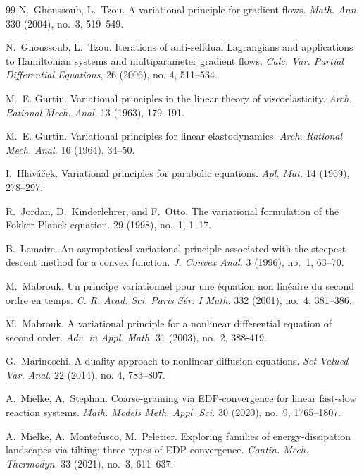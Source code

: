\documentclass[reqno]{amsart}
\begin{document}
\begin{thebibliography}{99}
{N.~Ghoussoub, L.~Tzou}. {A variational principle for gradient
  flows}. {\it Math. Ann.} 330 (2004), no.~3, 519--549.

N.~Ghoussoub, L.~Tzou. Iterations of anti-selfdual Lagrangians and
applications to Hamiltonian systems and multiparameter gradient
flows. {\it Calc. Var. Partial Differential Equations}, 26 (2006),
no. 4, 511–534.

{M.~E. Gurtin}. {Variational principles in the linear theory of
  viscoelasticity}. {\it Arch. Rational Mech. Anal.} 13 (1963), 179--191.

{M.~E. Gurtin}. {Variational
  principles for linear elastodynamics}. {\it  Arch. Rational Mech. Anal.} 16 (1964),
  34--50.

{I.~Hlav{\'a}{\v{c}}ek}. {Variational principles for parabolic
  equations}. {\it Apl. Mat.} 14 (1969), 278--297.

 R.~Jordan, D.~Kinderlehrer, and F.~Otto. \newblock The variational formulation of the Fokker-Planck equation.
    29 (1998),  no.~1,   1--17.

{B.~Lemaire}.  An asymptotical variational principle associated with
  the steepest descent method for a convex function. {\it J. Convex Anal.} 3
  (1996), no.~1, 63--70.

M.~Mabrouk. Un principe
  variationnel pour une \'equation non lin\'eaire du second ordre en
  temps. {\it C.
  R. Acad. Sci. Paris S\'er. I Math.} 332 (2001), no.~4,  381--386.

M.~Mabrouk. A variational
  principle for a nonlinear differential equation of second order. {\it Adv. in
  Appl. Math.} 31 (2003), no.~2, 388-419.

G.~Marinoschi. A duality approach to nonlinear diffusion
equations. {\it Set-Valued Var. Anal.} 22 (2014), no. 4, 783--807.

  A.~Mielke, A.~Stephan. Coarse-graining via EDP-convergence for
  linear fast-slow reaction systems. {\it Math. Models 
  Meth. Appl. Sci.} 30  (2020), no.~9, 1765--1807.
 
A.~Mielke, A.~Montefusco, M.~Peletier. Exploring families of
energy-dissipation landscapes via tilting: three types of EDP
convergence. {\it Contin. Mech. Thermodyn.} 33 (2021), no.~3,
611--637.


\end{thebibliography}
\end{document}
